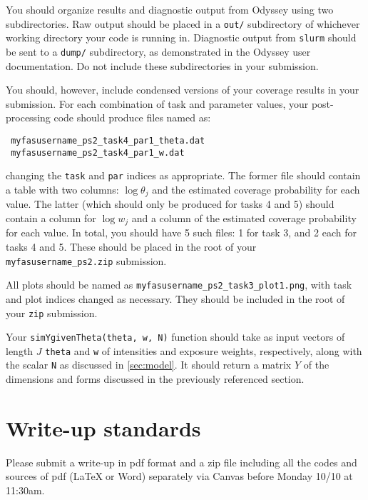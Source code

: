 \documentclass[11pt]{article}
\makeatletter
\newcommand{\duedate}{Monday 10/10 at 11:30am}
\newcommand{\email}{zhiruihu@g.harvard.edu}
\makeatother
\begin{document}
You should organize results and diagnostic output from Odyssey using two subdirectories. Raw output should be placed in a \verb+out/+ subdirectory of whichever working directory your code is running in. Diagnostic output from \verb+slurm+ should be sent to a \verb+dump/+ subdirectory, as demonstrated in the Odyssey user documentation. Do not include these subdirectories in your submission.

You should, however, include condensed versions of your coverage results in your submission. For each combination of task and parameter values, your post-processing code should produce files named as:
\begin{verbatim}
 myfasusername_ps2_task4_par1_theta.dat
 myfasusername_ps2_task4_par1_w.dat
\end{verbatim}
changing the \verb+task+ and \verb+par+ indices as appropriate. The former file should contain a table with two columns: $\log \theta_j$ and the estimated coverage probability for each value. The latter (which should only be produced for tasks 4 and 5) should contain a column for $\log w_j$ and a column of the estimated coverage probability for each value. In total, you should have 5 such files: 1 for task 3, and 2 each for tasks 4 and 5. These should be placed in the root of your \verb+myfasusername_ps2.zip+ submission.

All plots should be named as \verb+myfasusername_ps2_task3_plot1.png+, with task and plot indices changed as necessary. They should be included in the root of your \verb+zip+ submission.

Your \verb+simYgivenTheta(theta, w, N)+ function should take as input vectors of length $J$ \verb+theta+ and \verb+w+ of intensities and exposure weights, respectively, along with the scalar \verb+N+ as discussed in \autoref{sec:model}. It should return a matrix $Y$ of the dimensions and forms discussed in the previously referenced section.


\section{Write-up standards}
\label{sec:output}

Please submit a write-up in pdf format and a zip file including all the codes and sources of pdf (\LaTeX$\;$or Word) separately via Canvas before 
\duedate. 
\end{document}

